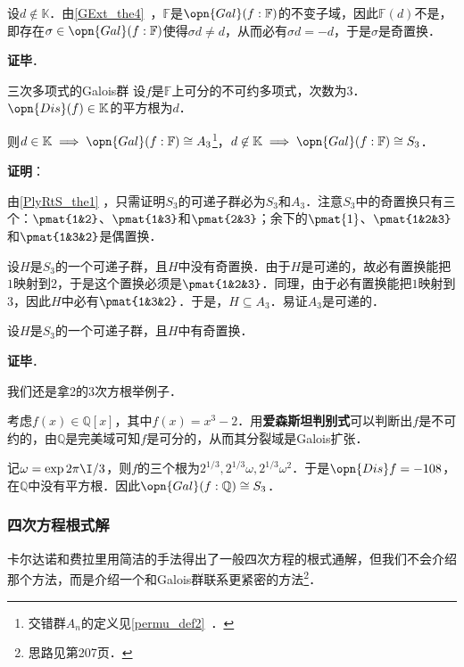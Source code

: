 设$d\not\in\mathbb{K}$．由\autoref{GExt_the4}~，$\mathbb{F}$是$\opn{Gal}(f:\mathbb{F})$的不变子域，因此$\mathbb{F}(d)$不是，即存在$\sigma\in\opn{Gal}(f:\mathbb{F})$使得$\sigma d\neq d$，从而必有$\sigma d= -d$，于是$\sigma$是奇置换．

\textbf{证毕}．


\begin{corollary}{三次多项式的Galois群}
设$f$是$\mathbb{F}$上可分的不可约多项式，次数为$3$．$\opn{Dis}(f)\in\mathbb{K}$的平方根为$d$．

则$d\in\mathbb{K}\implies\opn{Gal}(f:\mathbb{F})\cong A_3$\footnote{交错群$A_n$的定义见\autoref{permu_def2}~．}，$d\not\in\mathbb{K}\implies\opn{Gal}(f:\mathbb{F})\cong S_3$．
\end{corollary}

\textbf{证明}：

由\autoref{PlyRtS_the1} ，只需证明$S_3$的可递子群必为$S_3$和$A_3$．注意$S_3$中的奇置换只有三个：$\pmat{1&2}$、$\pmat{1&3}$和$\pmat{2&3}$；余下的$\pmat{1}$、$\pmat{1&2&3}$和$\pmat{1&3&2}$是偶置换．

设$H$是$S_3$的一个可递子群，且$H$中没有奇置换．由于$H$是可递的，故必有置换能把$1$映射到$2$，于是这个置换必须是$\pmat{1&2&3}$．同理，由于必有置换能把$1$映射到$3$，因此$H$中必有$\pmat{1&3&2}$．于是，$H\subseteq A_3$．易证$A_3$是可递的．

设$H$是$S_3$的一个可递子群，且$H$中有奇置换．

\textbf{证毕}．

\begin{example}{}
我们还是拿2的3次方根举例子．

考虑$f(x)\in\mathbb{Q}[x]$，其中$f(x)=x^3-2$．用\textbf{爱森斯坦判别式}可以判断出$f$是不可约的，由$\mathbb{Q}$是完美域可知$f$是可分的，从而其分裂域是Galois扩张．

记$\omega=\exp{2\pi\I/3}$，则$f$的三个根为$2^{1/3}, 2^{1/3}\omega, 2^{1/3}\omega^2$．于是$\opn{Dis}f=-108$，在$\mathbb{Q}$中没有平方根．因此$\opn{Gal}(f:\mathbb{Q})\cong S_3$．
\end{example}




\subsubsection{四次方程根式解}

卡尔达诺和费拉里用简洁的手法得出了一般四次方程的根式通解，但我们不会介绍那个方法，而是介绍一个和Galois群联系更紧密的方法\footnote{思路见\cite{GTM242}第207页．}．


